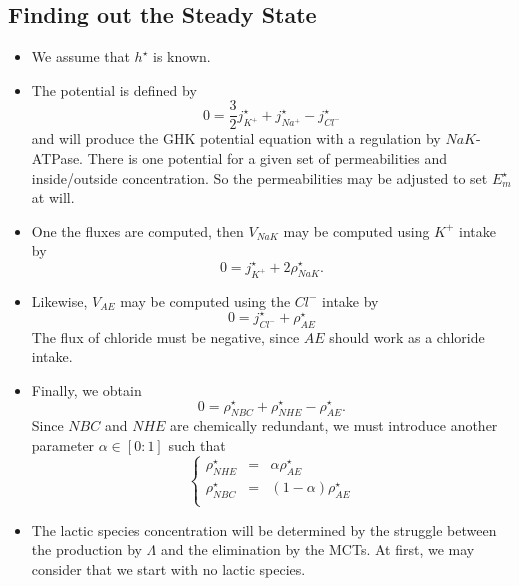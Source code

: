 \documentclass{revtex4}
\begin{document}
\subsection{Finding out the Steady State}
\begin{itemize}
\item We assume that $h^\star$ is known.
\item
The potential is defined by
\begin{equation}
	0 = \dfrac{3}{2}j_{K^+}^\star + j_{Na^+}^\star - j_{Cl^-}^\star
\end{equation}
and will produce the GHK potential equation with a regulation by $NaK$-ATPase.
There is one potential for a given set of permeabilities and inside/outside concentration.
So the permeabilities may be adjusted to set $E_m^\star$ at will.
\item One the fluxes are computed, then $V_{NaK}$ may be computed using $K^+$ intake by
	\begin{equation}
		0 = j_{K^+}^\star + 2 \rho_{NaK}^\star.
	\end{equation}
\item Likewise, $V_{AE}$ may be computed using the $Cl^-$ intake by
	\begin{equation}
		0 = j_{Cl^-}^\star + \rho_{AE}^\star
	\end{equation}
	The flux of chloride must be negative, since $AE$ should work as a chloride intake.
\item Finally, we obtain
\begin{equation}
	0 = \rho_{NBC}^\star+\rho_{NHE}^\star - \rho_{AE}^\star.
\end{equation}
Since $NBC$ and $NHE$ are chemically redundant, we must introduce another parameter $\alpha\in[0:1]$
such that 
\begin{equation}
	\left\lbrace
	\begin{array}{rcr}
	\rho_{NHE}^\star & = & \alpha \rho_{AE}^\star\\
	\rho_{NBC}^\star & = & (1-\alpha) \rho_{AE}^\star\\ 
	\end{array}
	\right.
\end{equation}

\item The lactic species concentration will be determined by the struggle between the production
by $\Lambda$ and the elimination by the MCTs. At first, we may consider that we start with no lactic species.


\end{itemize}
\end{document}
